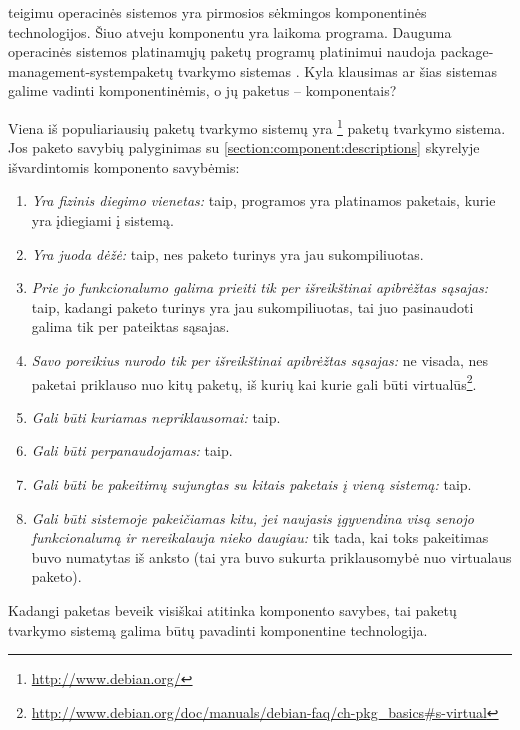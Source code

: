 \cite[12]{cs-beyond-object-oriented-programming} teigimu operacinės
sistemos yra pirmosios sėkmingos komponentinės technologijos. Šiuo
atveju komponentu yra laikoma programa. Dauguma 
operacinės sistemos platinamųjų paketų  programų
platinimui naudoja \gls{package-management-system}{paketų tvarkymo
sistemas} . Kyla klausimas ar šias
sistemas galime vadinti komponentinėmis, o jų paketus –
komponentais?

Viena iš populiariausių paketų tvarkymo sistemų yra
\footnote{\url{http://www.debian.org/}} paketų
tvarkymo sistema. Jos paketo savybių palyginimas su
\ref{section:component:descriptions} skyrelyje išvardintomis
komponento savybėmis:
\begin{enumerate}
  \item \emph{Yra fizinis diegimo vienetas:} taip, programos yra
    platinamos paketais, kurie yra įdiegiami į sistemą.
  \item \emph{Yra juoda dėžė:} taip, nes paketo turinys yra jau
    sukompiliuotas.
  \item \emph{Prie jo funkcionalumo galima prieiti tik per
    išreikštinai apibrėžtas sąsajas:} taip, kadangi paketo turinys
    yra jau sukompiliuotas, tai juo pasinaudoti galima tik per
    pateiktas sąsajas.
  \item \emph{Savo poreikius nurodo tik per išreikštinai apibrėžtas
    sąsajas:} ne visada, nes  paketai priklauso nuo
    kitų paketų, iš kurių kai kurie gali būti virtualūs\footnote{
    \url{http://www.debian.org/doc/manuals/debian-faq/ch-pkg_basics\#s-virtual}}.
  \item \emph{Gali būti kuriamas nepriklausomai:} taip.
  \item \emph{Gali būti perpanaudojamas:} taip.
  \item \emph{Gali būti be pakeitimų sujungtas su kitais paketais
    į vieną sistemą:} taip.
  \item \emph{Gali būti sistemoje pakeičiamas kitu, jei naujasis
    įgyvendina visą senojo funkcionalumą ir nereikalauja nieko
    daugiau:} tik tada, kai toks pakeitimas buvo numatytas iš anksto
    (tai yra buvo sukurta priklausomybė nuo virtualaus paketo).
\end{enumerate}
Kadangi  paketas beveik visiškai atitinka komponento
savybes, tai  paketų tvarkymo sistemą galima
būtų pavadinti komponentine technologija.

